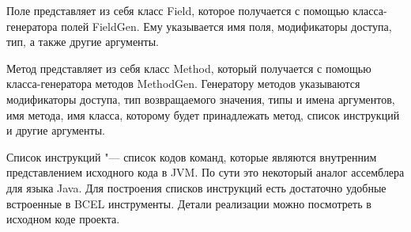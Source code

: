 Поле представляет из себя класс Field, которое получается с помощью класса-генератора полей FieldGen. Ему указывается имя поля, модификаторы доступа, тип, а также 
другие аргументы.

Метод представляет из себя класс Method, который получается с помощью класса-генератора методов MethodGen.
Генератору методов указываются модификаторы доступа, тип возвращаемого значения, типы и имена аргументов, имя метода, имя класса, которому будет принадлежать метод, 
список инструкций и другие аргументы.

Список инструкций "--- список кодов команд, которые являются внутренним представлением исходного кода в JVM. По сути это некоторый аналог ассемблера для языка Java.
Для построения списков инструкций есть достаточно удобные встроенные в BCEL инструменты. Детали реализации можно посмотреть в исходном коде проекта.
